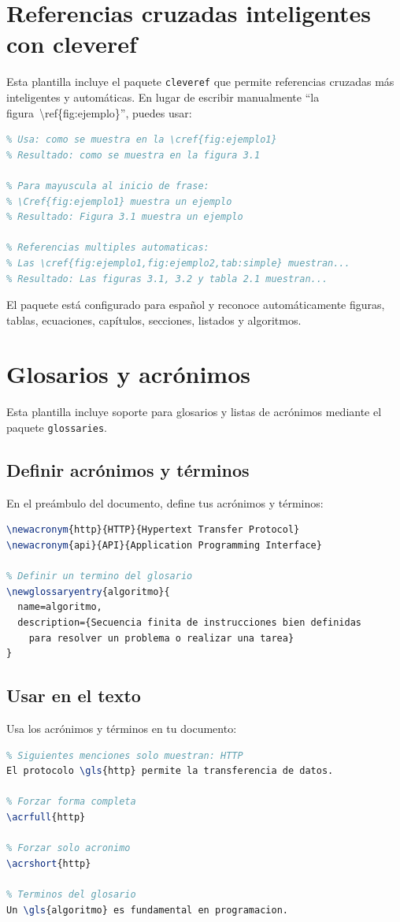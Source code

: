 \section{Referencias cruzadas inteligentes con cleveref}
Esta plantilla incluye el paquete \texttt{cleveref} que permite referencias cruzadas más inteligentes y automáticas. En lugar de escribir manualmente ``la figura~\textbackslash ref\{fig:ejemplo\}'', puedes usar:
\begin{lstlisting}[language=TeX, caption={Ejemplos de uso de cleveref}]
% En lugar de: como se muestra en la figura~\ref{fig:ejemplo1}
% Usa: como se muestra en la \cref{fig:ejemplo1}
% Resultado: como se muestra en la figura 3.1

% Para mayuscula al inicio de frase:
% \Cref{fig:ejemplo1} muestra un ejemplo
% Resultado: Figura 3.1 muestra un ejemplo

% Referencias multiples automaticas:
% Las \cref{fig:ejemplo1,fig:ejemplo2,tab:simple} muestran...
% Resultado: Las figuras 3.1, 3.2 y tabla 2.1 muestran...
\end{lstlisting}
El paquete está configurado para español y reconoce automáticamente figuras, tablas, ecuaciones, capítulos, secciones, listados y algoritmos.

\section{Glosarios y acrónimos}
Esta plantilla incluye soporte para glosarios y listas de acrónimos mediante el paquete \texttt{glossaries}.

\subsection{Definir acrónimos y términos}
En el preámbulo del documento, define tus acrónimos y términos:
\begin{lstlisting}[language=TeX, caption={Definición de acrónimos y glosario}]
% Definir un acronimo
\newacronym{http}{HTTP}{Hypertext Transfer Protocol}
\newacronym{api}{API}{Application Programming Interface}

% Definir un termino del glosario
\newglossaryentry{algoritmo}{
  name=algoritmo,
  description={Secuencia finita de instrucciones bien definidas 
    para resolver un problema o realizar una tarea}
}
\end{lstlisting}

\subsection{Usar en el texto}
Usa los acrónimos y términos en tu documento:
\begin{lstlisting}[language=TeX, caption={Uso de acrónimos y glosario en el texto}]
% Primera mencion muestra completo: HTTP (HyperText Protocol)
% Siguientes menciones solo muestran: HTTP
El protocolo \gls{http} permite la transferencia de datos.

% Forzar forma completa
\acrfull{http}

% Forzar solo acronimo
\acrshort{http}

% Terminos del glosario
Un \gls{algoritmo} es fundamental en programacion.
\end{lstlisting}

